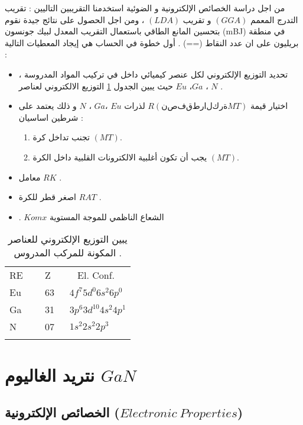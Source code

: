 من اجل دراسة الخصائص الإلكترونية و الضوئية استخدمنا التقريبين التاليين : تقريب التدرج المعمم $ (GGA) $ و تقريب $ (LDA) $ ، ومن اجل الحصول على نتائج جيدة نقوم بتحسين المانع الطاقي باستعمال التقريب المعدل لبيك جونسون (mBJ) في منطقة بريليون على ان عدد النقاط (==) .
		أول خطوة في الحساب هي إيجاد المعطيات التالية :
\begin{itemize}
	\item 
	تحديد التوزيع الإلكتروني لكل عنصر كيميائي داخل في تركيب المواد المدروسة ، حيث يبين الجدول \ref{tab:1} التوزيع الالكتروني لعناصر $ Eu $  ،$ Ga $ ، $ N $ .	

		\item 

		 اختيار قيمة $  R (نصف قطر الكرة MT) $ لذرات $ Eu $  ،$ Ga $ ، $ N $  و ذلك يعتمد على شرطين اساسیان :
		\begin{enumerate}
			\item 
			تجنب تداخل كرة $ (MT) $.
			\item 
			يجب أن تكون أغلبية الالكترونات القلبية داخل الكرة $ (MT) $.

		\end{enumerate}
		
			\item 
			معامل $ RK $ .
				\item 
				اصغر قطر للكرة $ RAT $ .
				\item
				. $ Komx $ الشعاع الناظمي للموجة المستوية
\end{itemize}
	\begin{table}
	\centering
	\begin{tabular}{lll}
		\hline\noalign{\smallskip}
		RE &~~ Z~~ &~ El. Conf. \\
		\noalign{\smallskip}\hline\noalign{\smallskip}
		Eu &~~ 63~ & $ 4f^{7} 5d^{0} 6s^{2} 6p^{0} $ \\
		Ga &~~ 31~ & $ 3p^{6} 3d^{10} 4s^{2} 4p^{1}  $  \\
		N &~~ 07~ & $ 1s^{2} 2s^{2} 2p^{3} $\\
		\noalign{\smallskip}\hline
	\end{tabular}
	\caption{ يبين التوزيع الإلكتروني للعناصر المكونة للمركب المدروس .  }
	\label{tab:1}
\end{table}
\FloatBarrier

\section{ نتريد الغاليوم $ GaN $}
\subsection{ الخصائص الإلكترونية ($ Electronic~Properties $)  }

